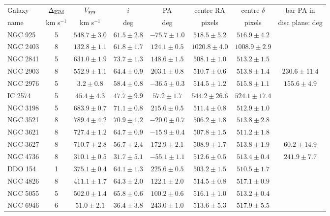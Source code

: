 \documentclass[letterpaper,fleqn,usenatbib]{mnras}
\begin{document}
\begin{table}
\begin{tabular}{@{}lccccccc}
Galaxy & $\Delta_{\rm ISM}$ & $V_{\rm sys}$ & $i$ &  PA & centre RA & centre $\delta$ & bar PA in \\
name & km s$^{-1}$ & km s$^{-1}$ & deg & deg & pixels & pixels & disc plane: deg \\
NGC 925 & 5 & $548.7 \pm 3.0$ & $61.5 \pm 2.8$ & $-75.7 \pm 1.0$ 
& $518.5 \pm 5.2$ & $516.9 \pm  4.2$ \\
NGC 2403 & 8 & $132.8 \pm 1.1$ & $61.8 \pm 1.7$ & $124.1 \pm 0.5$
& $1020.8 \pm 4.0$ & $1008.9 \pm 2.9$ \\
NGC 2841 & 5 & $631.0 \pm 1.9$ & $73.7 \pm 1.3$ & $148.6 \pm 1.5$
& $508.1 \pm 1.0$ & $513.2 \pm 1.5$ \\
NGC 2903 & 8 & $552.9 \pm 1.1$ & $64.4 \pm 0.9$ & $203.1 \pm 0.8$ 
& $510.7 \pm 0.6$ & $513.8 \pm 1.4$ & $230.6 \pm 11.4$ \\
NGC 2976 & 5 & $3.2 \pm 0.8$ & $58.4 \pm 0.8$ & $-36.5 \pm 0.3$ 
& $514.5 \pm 1.2$ & $515.8 \pm 1.1$ & $155.6 \pm 4.9$ \\
IC 2574 & 5 & $45.4 \pm 4.3$ & $47.7 \pm 9.9$ & $57.2 \pm 1.7$ 
& $544.2 \pm 26.6$ & $524.1 \pm 17.4$ \\
NGC 3198 & 5 & $683.9 \pm 0.7$ & $71.1 \pm 0.8$ & $215.6 \pm 0.5$ 
& $511.4 \pm 0.8$ & $512.9 \pm 1.0$  \\
NGC 3521 & 8 & $789.4 \pm 4.2$ & $70.9 \pm 1.2$ & $-20.0 \pm 0.7$ 
& $506.2 \pm 1.8$ & $513.8 \pm 2.8$  \\
NGC 3621 & 8 & $727.4 \pm 1.2$ & $64.7 \pm 0.9$ & $-15.9 \pm 0.4$
& $507.8 \pm 1.5$ & $511.2 \pm 1.8$ \\
NGC 3627 & 8 & $710.7 \pm 2.8$ & $56.7 \pm 2.4$ & $172.9 \pm 2.1$ 
& $508.9 \pm 1.7$ & $513.8 \pm 1.9$ & $60.2 \pm 14.9$ \\
NGC 4736 & 8 & $310.1 \pm 0.5$ & $31.7 \pm 5.1$ & $-55.1 \pm 1.1$
& $512.6 \pm 0.5$ & $513.4 \pm 0.4$ & $241.9 \pm 7.7$ \\
DDO 154 & 1 & $375.1 \pm 0.4$ & $64.1 \pm 1.3$ & $225.6 \pm 0.5$ 
& $503.2 \pm 1.5$ & $510.5 \pm 1.7$  \\
NGC 4826 & 8 & $411.1 \pm 1.7$ & $64.3 \pm 2.0$ & $122.1 \pm 2.0$ 
& $514.5 \pm 0.8$ & $517.1 \pm 0.9$  \\
NGC 5055 & 5 & $502.0 \pm 1.4$ & $65.8 \pm 0.6$ & $100.2 \pm 0.6$
& $516.1 \pm 1.0$ & $513.2 \pm 0.4$ \\
NGC 6946 & 6 & $51.0 \pm 2.1$ & $36.4 \pm 3.8$ & $243.0 \pm 1.0$
& $513.6 \pm 5.3$ & $517.9 \pm 5.5$ \\

\end{tabular}
\end{table}
\end{document}
